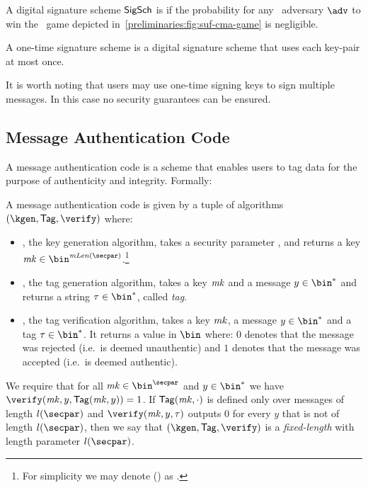 \begin{definition}\label{preliminaries:def:sufcma}
A digital signature scheme $\mathsf{SigSch}$ is \sufcma{} if the probability for any \ppt~adversary $\adv$ to win the \sufcma~game depicted in~\cref{preliminaries:fig:suf-cma-game} is negligible.
\end{definition}

\begin{definition}\label{preliminaries:def:ot-sig}
    A one-time signature scheme is a digital signature scheme that uses each key-pair at most once.
\end{definition}

\begin{remark}
    It is worth noting that users may use one-time signing keys to sign multiple messages. In this case no security guarantees can be ensured.
\end{remark}
\subsection{Message Authentication Code}
A message authentication code is a scheme that enables users to tag data for the purpose of authenticity and integrity. Formally:

\begin{definition}
A message authentication code \mac{} is given by a tuple of \ppt{} algorithms $(\kgen,\tagg, \verify)$ where:
    \begin{itemize}
        \item \kgen{}, the key generation algorithm, takes a security parameter \secparam{}, and returns a key $\mk \in \bin^{\macKeyLen(\secpar)}$.\footnote{For simplicity we may denote \macKeyLen(\secpar) as \macKeyLen{}.}
        \item \tagg{}, the tag generation algorithm, takes a key $\mathit{mk}$ and a message $ y\in\bin^{*} $ and returns a string $\tau\in\bin^{*}$, called \emph{tag}.
        \item  \verify{}, the tag verification algorithm, takes a key $\mathit{mk}$, a message $ y \in \bin^{*} $ and a tag $\tau \in \bin^{*}$. It returns a value in $\bin$ where: $0$ denotes that the message was rejected (i.e.~is deemed unauthentic) and $1$ denotes that the message was accepted (i.e.~is deemed authentic).
    \end{itemize}
    We require that for all $\mk \in \bin^{\secpar}$ and $y \in \bin^{*}$ we have $\verify(\mk, y, \tagg(\mk,y)) = 1$. If $\mathsf{Tag}(\mathit{mk},\cdot)$ is defined only over messages of length $l(\secpar)$ and $\verify(\mk,y,\tau)$ outputs $0$ for every $y$ that is not of length $l(\secpar)$, then we say that $(\kgen,\tagg, \verify)$ is a \emph{fixed-length} \mac{} with length parameter $l(\secpar)$.
\end{definition}

